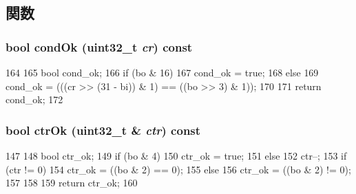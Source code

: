 \subsection{関数}
\hypertarget{classPowerISA_1_1BranchCond_ade38bdf10b82726b48a3ff6b5a3b4b40}{
\subsubsection[{condOk}]{\setlength{\rightskip}{0pt plus 5cm}bool condOk ({\bf uint32\_\-t} {\em cr}) const}}
\label{classPowerISA_1_1BranchCond_ade38bdf10b82726b48a3ff6b5a3b4b40}



\begin{DoxyCode}
164     {
165         bool cond_ok;
166         if (bo & 16) {
167             cond_ok = true;
168         } else {
169             cond_ok = (((cr >> (31 - bi)) & 1) == ((bo >> 3) & 1));
170         }
171         return cond_ok;
172     }
\end{DoxyCode}
\hypertarget{classPowerISA_1_1BranchCond_a8339b9326dff29ad0ebbab68d0e92bf7}{
\subsubsection[{ctrOk}]{\setlength{\rightskip}{0pt plus 5cm}bool ctrOk ({\bf uint32\_\-t} \& {\em ctr}) const}}
\label{classPowerISA_1_1BranchCond_a8339b9326dff29ad0ebbab68d0e92bf7}



\begin{DoxyCode}
147     {
148         bool ctr_ok;
149         if (bo & 4) {
150             ctr_ok = true;
151         } else {
152             ctr--;
153             if (ctr != 0) {
154                 ctr_ok = ((bo & 2) == 0);
155             } else {
156                 ctr_ok = ((bo & 2) != 0);
157             }
158         }
159         return ctr_ok;
160     }
\end{DoxyCode}


